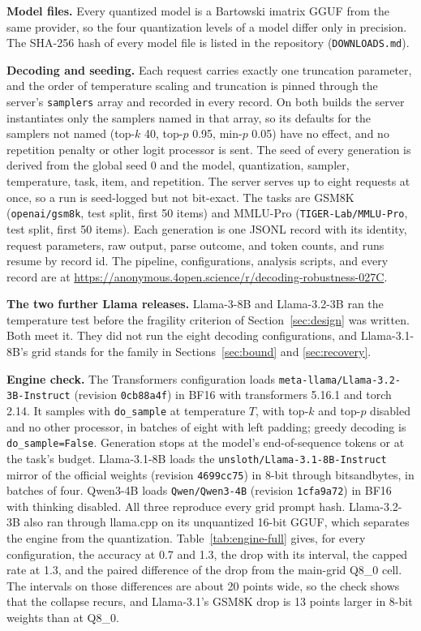 \documentclass[11pt]{article}
\begin{document}
\textbf{Model files.} Every quantized model is a Bartowski imatrix GGUF from the same provider,
so the four quantization levels of a model differ only in precision. The SHA-256 hash of every
model file is listed in the repository (\texttt{DOWNLOADS.md}).

\textbf{Decoding and seeding.} Each request carries exactly one truncation parameter, and the
order of temperature scaling and truncation is pinned through the server's \texttt{samplers}
array and recorded in every record. On both builds the server instantiates only the samplers
named in that array, so its defaults for the samplers not named (top-$k$ 40, top-$p$ 0.95,
min-$p$ 0.05) have no effect, and no repetition penalty or other logit processor is sent. The
seed of every generation is derived from the global seed 0 and the model, quantization,
sampler, temperature, task, item, and repetition. The server serves up to eight requests at
once, so a run is seed-logged but not bit-exact. The tasks are GSM8K (\texttt{openai/gsm8k},
test split, first 50 items) and MMLU-Pro (\texttt{TIGER-Lab/MMLU-Pro}, test split, first 50
items). Each generation is one JSONL record with its identity, request parameters, raw output,
parse outcome, and token counts, and runs resume by record id. The pipeline, configurations,
analysis scripts, and every record are at
\url{https://anonymous.4open.science/r/decoding-robustness-027C}.

\textbf{The two further Llama releases.} Llama-3-8B and Llama-3.2-3B ran the temperature test
before the fragility criterion of Section~\ref{sec:design} was written. Both meet it. They did
not run the eight decoding configurations, and Llama-3.1-8B's grid stands for the family in
Sections~\ref{sec:bound} and \ref{sec:recovery}.

\textbf{Engine check.} The Transformers \citep{wolf2020transformers} configuration loads
\texttt{meta-llama/Llama-3.2-3B-Instruct} (revision \texttt{0cb88a4f}) in BF16 with
transformers 5.16.1 and torch 2.14. It samples with \texttt{do\_sample} at temperature $T$,
with top-$k$ and top-$p$ disabled and no other processor, in batches of eight with left
padding; greedy decoding is \texttt{do\_sample=False}. Generation stops at the model's
end-of-sequence tokens or at the task's budget. Llama-3.1-8B loads the
\texttt{unsloth/Llama-3.1-8B-Instruct} mirror of the official weights (revision
\texttt{4699cc75}) in 8-bit through bitsandbytes, in batches of four. Qwen3-4B loads
\texttt{Qwen/Qwen3-4B} (revision \texttt{1cfa9a72}) in BF16 with thinking disabled. All three
reproduce every grid prompt hash. Llama-3.2-3B also ran through llama.cpp on its unquantized
16-bit GGUF, which separates the engine from the quantization. Table~\ref{tab:engine-full}
gives, for every configuration, the accuracy at 0.7 and 1.3, the drop with its interval, the
capped rate at 1.3, and the paired difference of the drop from the main-grid Q8\_0 cell. The
intervals on those differences are about 20 points wide, so the check shows that the collapse
recurs, and Llama-3.1's GSM8K drop is 13 points larger in 8-bit weights than at Q8\_0.
\end{document}
